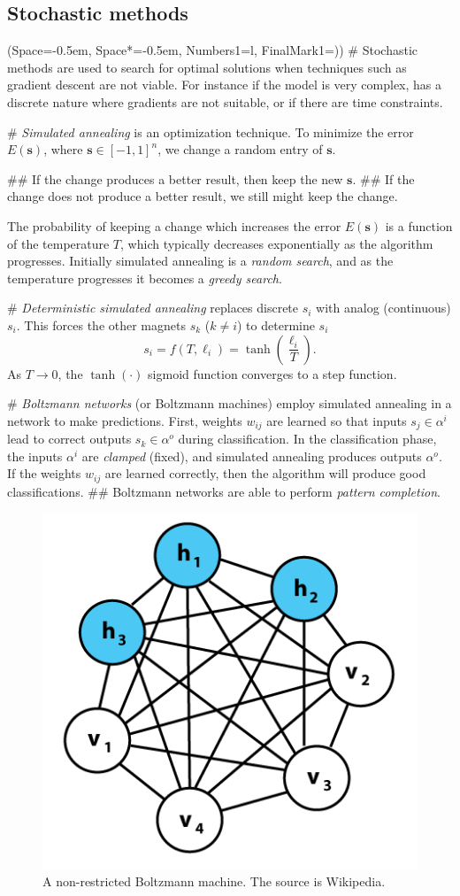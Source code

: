 \documentclass[12pt, a4paper]{article}
\newcommand{\listSpace}{-0.5em}%
\newcommand{\vect}[1]{\bm{#1}}
\begin{document}
\subsection{Stochastic methods}
\begin{easylist}[itemize]
\ListProperties(Space=\listSpace, Space*=\listSpace, Numbers1=l, FinalMark1={)})
# Stochastic methods are used to search for optimal solutions when techniques such as gradient descent are not viable.
For instance if the model is very complex, has a discrete nature where gradients are not suitable, or if there are time constraints.

# \emph{Simulated annealing} is an optimization technique.
To minimize the error $E(\vect{s})$, where $\vect{s} \in [-1, 1]^n$, we change a random entry of $\vect{s}$.
\begin{easylist}
## If the change produces a better result, then keep the new $\vect{s}$.
## If the change does not produce a better result, we still might keep the change. 
\end{easylist}
The probability of keeping a change which increases the error $E(\vect{s})$ is a function of the temperature $T$, which typically decreases exponentially as the algorithm progresses.
Initially simulated annealing is a \emph{random search}, and as the temperature progresses it becomes a \emph{greedy search}.

# \emph{Deterministic simulated annealing} replaces discrete $s_i$ with analog (continuous) $s_i$.
This forces the other magnets $s_k$ ($k \neq i$) to determine $s_i$
\begin{equation*}
	s_i = f(T, \ell_i) = \tanh \left( \frac{\ell_i}{T} \right).
\end{equation*}
As $T \to 0$, the $\tanh (\cdot)$ sigmoid function converges to a step function.


# \emph{Boltzmann networks} (or Boltzmann machines) employ simulated annealing in a network to make predictions.
First, weights $w_{ij}$ are learned so that inputs $s_j \in \alpha^i$ lead to correct outputs $s_k \in \alpha^o$ during classification.
In the classification phase, the inputs $\alpha^i$ are \emph{clamped} (fixed), and simulated annealing produces outputs $\alpha^o$.
If the weights $w_{ij}$ are learned correctly, then the algorithm will produce good classifications.
## Boltzmann networks are able to perform \emph{pattern completion}. 

\begin{figure}[ht!]
	\centering
	\includegraphics[width=0.3\linewidth]{figs/boltzmann}
	\caption{A non-restricted Boltzmann machine. The source is Wikipedia.}
	\label{fig:boltzmann}
\end{figure}


\end{easylist}
\end{document}
